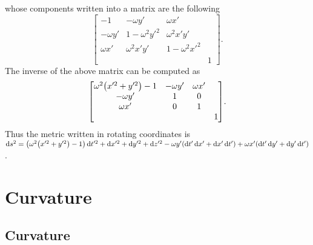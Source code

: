 \documentclass{note}
\numberwithin{equation}{chapter}
\newcommand{\diff}{\operatorname{d}\!}
\begin{document}
whose components written into a matrix are the following
\begin{equation*}
    \begin{bmatrix}
        -1         & -\omega y'     & \omega x'          \\
        -\omega y' & 1-\omega^2y'^2 & \omega^2x'y'       \\
        \omega x'  & \omega^2x'y'   & 1-\omega^2x'^2     \\
                   &                &                & 1
    \end{bmatrix}.
\end{equation*}
The inverse of the above matrix can be computed as
\begin{equation*}
    \begin{bmatrix}
        \omega^2\prn{x'^2+y'^2}-1 & -\omega y' & \omega x'     \\
        -\omega y'                & 1          & 0             \\
        \omega x'                 & 0          & 1             \\
                                  &            &           & 1
    \end{bmatrix}.
\end{equation*}
Thus the metric written in rotating coordinates is $\diff s^2 =
    \prn{\omega^2\prn{x'^2+y'^2}-1}\diff t'^2 + \diff x'^2 + \diff y'^2 + \diff
    z'^2 - \omega y'(\diff t'\diff x' + \diff x'\diff t') + \omega x' (\diff
    t'\diff y' + \diff y'\diff t')$.

\chapter{Curvature}

\setcounter{section}{1}

\section{Curvature}

\end{document}
